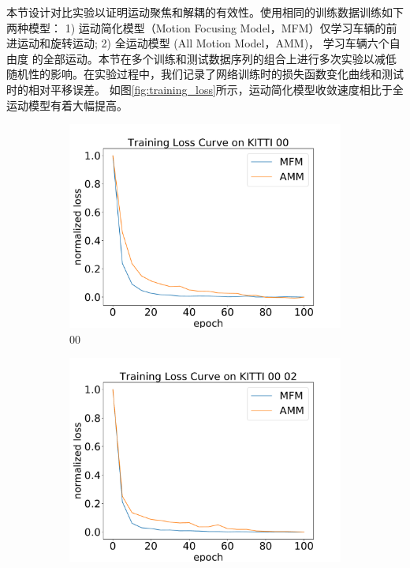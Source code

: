 \label{sec:ego_improvement}

本节设计对比实验以证明运动聚焦和解耦的有效性。使用相同的训练数据训练如下两种模型：
1) 运动简化模型（Motion Focusing Model，MFM）仅学习车辆的前进运动和旋转运动;  2) 全运动模型 (All Motion Model，AMM)， 学习车辆六个自由度
的全部运动。本节在多个训练和测试数据序列的组合上进行多次实验以减低随机性的影响。在实验过程中，我们记录了网络训练时的损失函数变化曲线和测试时的相对平移误差。
如图\ref{fig:training_loss}所示，运动简化模型收敛速度相比于全运动模型有着大幅提高。
\begin{figure}[ht]
    \centering
    \begin{subfigure}[c]{0.48\textwidth}
        \includegraphics[width=\textwidth]{datavo/training_loss_0.pdf}
        \caption{00}
        \label{fig:tl_0}
    \end{subfigure}
    \vspace*{2mm}
    \begin{subfigure}[c]{0.48\textwidth}
        \includegraphics[width=\textwidth]{datavo/training_loss_0-2.pdf} 

\end{subfigure}
\end{figure}
